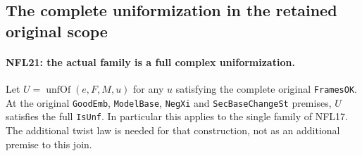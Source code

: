 \documentclass[11pt,a4paper]{article}
\numberwithin{equation}{section}
\theoremstyle{remark}\newtheorem{remark}[theorem]{Remark}
\begin{document}
\subsection{The complete uniformization in the retained original scope}

\paragraph{NFL21: the actual family is a full complex uniformization.}
\label{claim:NFL21}
Let $U=\operatorname{unfOf}(e,F,M,u)$ for any $u$ satisfying
the complete original \texttt{Frames\allowbreak OK}.  At the original
\texttt{Good\allowbreak Emb}, \texttt{Model\allowbreak Base}, \texttt{Neg\allowbreak Xi} and
\texttt{Sec\allowbreak Base\allowbreak Change\allowbreak St} premises, $U$ satisfies the full
\texttt{Is\allowbreak Unf}.  In particular this applies to the single
family of NFL17.  The additional twist law is needed for
that construction, not as an additional premise to this join.
\end{document}
